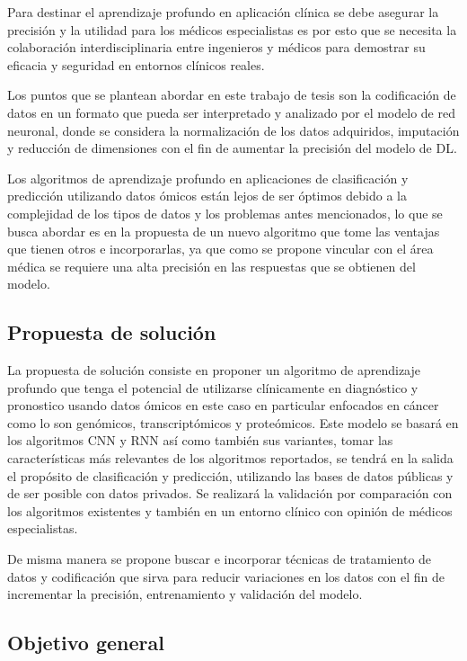 Para destinar el aprendizaje profundo en aplicación clínica se debe asegurar la precisión y la utilidad para los médicos especialistas es por esto que se necesita la colaboración interdisciplinaria entre ingenieros y médicos para demostrar su eficacia y seguridad en entornos clínicos reales.

Los puntos que se plantean abordar en este trabajo de tesis son la codificación de datos en un formato que pueda ser interpretado y analizado por el modelo de red neuronal, donde se considera la normalización de los datos adquiridos, imputación y reducción de dimensiones con el fin de aumentar la precisión del modelo de DL.

Los algoritmos de aprendizaje profundo en aplicaciones de clasificación y predicción utilizando datos ómicos están lejos de ser óptimos debido a la complejidad de los tipos de datos y los problemas antes mencionados, lo que se busca abordar es en la propuesta de un nuevo algoritmo que tome las ventajas que tienen otros e incorporarlas, ya que como se propone vincular con el área médica se requiere una alta precisión en las respuestas que se obtienen del modelo.

\subsection{Propuesta de solución}

La propuesta de solución consiste en proponer un algoritmo de aprendizaje profundo que tenga el potencial de utilizarse clínicamente en diagnóstico y pronostico usando datos ómicos en este caso en particular enfocados en cáncer como lo son genómicos, transcriptómicos y proteómicos. Este modelo se basará en los algoritmos CNN y RNN así como también sus variantes, tomar las características más relevantes de los algoritmos reportados, se tendrá en la salida el propósito de clasificación y predicción, utilizando las bases de datos públicas y de ser posible con datos privados. Se realizará la validación por comparación con los algoritmos existentes y también en un entorno clínico con opinión de médicos especialistas.

De misma manera se propone buscar e incorporar técnicas de tratamiento de datos y codificación que sirva para reducir variaciones en los datos con el fin de incrementar la precisión, entrenamiento y validación del modelo.


\subsection{Objetivo general}

